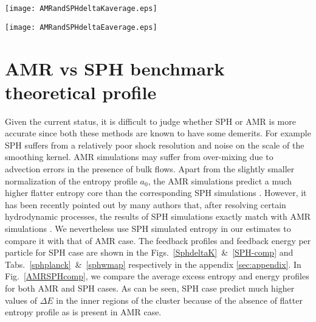 \documentclass[a4paper,fleqn,usenatbib]{mnras}
\begin{document}

\begin{figure*}
\begin{minipage}{8.5cm}
 \texttt{[image: AMRandSPHdeltaKaverage.eps]}
\end{minipage}
\begin{minipage}{8.5cm}
 \texttt{[image: AMRandSPHdeltaEaverage.eps]}
\end{minipage}   
\caption{Comparison of feedback profiles for AMR and SPH cases. For meaningful comparison, we have scaled x-axis of all  with same $m_{g,500}$ as that of fiducial case (i.e with clumping  and $P_{nt}\neq0$).}
\label{AMRSPHcomp}
\end{figure*}

\section{AMR vs SPH benchmark theoretical profile} 
Given the current status, it is difficult to judge whether SPH or AMR is more accurate since  both these methods are known to have some demerits. For example SPH suffers from a relatively poor shock resolution and 
noise on the scale of the smoothing kernel. AMR simulations may suffer from over-mixing
due to advection errors in the presence of bulk flows. Apart from the slightly smaller normalization of the entropy profile $a_0$, the AMR simulations predict a much higher flatter entropy core than the corresponding SPH simulations \citep{Voit2005}.
However, it has been recently pointed out by many authors that, after resolving certain hydrodynamic processes, the results of SPH simulations exactly match with AMR simulations \citep{Mitchell2009,Vazza2011,Valdarnini2012,Power2014,Biffi2015}.
We nevertheless use SPH simulated entropy in our estimates to compare it with that of AMR case. The feedback profiles and feedback energy per particle for SPH case are shown in the Figs.~\ref{SphdeltaK}~\&~\ref{SPH-comp} and Tabs.~\ref{sphplanck}~\&~\ref{sphwmap} respectively in the appendix \ref{sec:appendix}. In Fig.~\ref{AMRSPHcomp}, we compare the average excess entropy and energy profiles for both AMR and SPH cases.
As can be seen, SPH case predict much higher values of $\Delta E$ in the inner regions of the cluster because of the absence of flatter entropy profile as is present in AMR case. 
\end{document}
